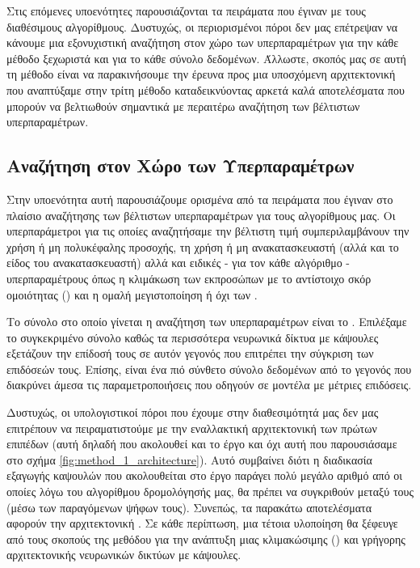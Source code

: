 Στις επόμενες υπο\textendash ενότητες παρουσιάζονται τα πειράματα που έγιναν με τους διαθέσιμους αλγορίθμους. Δυστυχώς, οι περιορισμένοι πόροι δεν μας επέτρεψαν να κάνουμε μια εξονυχιστική αναζήτηση στον χώρο των υπερπαραμέτρων για την κάθε μέθοδο ξεχωριστά και για το κάθε σύνολο δεδομένων. Άλλωστε, σκοπός μας σε αυτή τη μέθοδο είναι να παρακινήσουμε την έρευνα προς μια υποσχόμενη αρχιτεκτονική που αναπτύξαμε στην τρίτη μέθοδο καταδεικνύοντας αρκετά καλά αποτελέσματα που μπορούν να βελτιωθούν σημαντικά με περαιτέρω αναζήτηση των βέλτιστων υπερπαραμέτρων.\par

\subsection{Αναζήτηση στον Χώρο των Υπερπαραμέτρων}
Στην υποενότητα αυτή παρουσιάζουμε ορισμένα από τα πειράματα που έγιναν στο πλαίσιο αναζήτησης των βέλτιστων υπερπαραμέτρων για τους αλγορίθμους μας. Οι υπερπαράμετροι για τις οποίες αναζητήσαμε την βέλτιστη τιμή συμπεριλαμβάνουν την χρήση ή μη πολυκέφαλης προσοχής, τη χρήση ή μη ανακατασκευαστή (αλλά και το είδος του ανακατασκευαστή) αλλά και ειδικές - για τον κάθε αλγόριθμο - υπερπαραμέτρους όπως η κλιμάκωση των εκπροσώπων με το αντίστοιχο σκόρ ομοιότητας () και η ομαλή μεγιστοποίηση ή όχι των .\par

Το σύνολο στο οποίο γίνεται η αναζήτηση των υπερπαραμέτρων είναι το . Επιλέξαμε το συγκεκριμένο σύνολο καθώς τα περισσότερα νευρωνικά δίκτυα με κάψουλες εξετάζουν την επίδοσή τους σε αυτόν γεγονός που επιτρέπει την σύγκριση των επιδόσεών τους. Επίσης, είναι ένα πιό σύνθετο σύνολο δεδομένων από το  γεγονός που διακρύνει άμεσα τις παραμετροποιήσεις που οδηγούν σε μοντέλα με μέτριες επιδόσεις.\par

Δυστυχώς, οι υπολογιστικοί πόροι που έχουμε στην διαθεσιμότητά μας δεν μας επιτρέπουν να πειραματιστούμε με την εναλλακτική αρχιτεκτονική των πρώτων επιπέδων (αυτή δηλαδή που ακολουθεί και το έργο \cite{hinton2018matrix} και όχι αυτή που παρουσιάσαμε στο σχήμα \ref{fig:method_1_architecture}). Αυτό συμβαίνει διότι η διαδικασία εξαγωγής καψουλών που ακολουθείται στο έργο \cite{sabour2017dynamic} παράγει πολύ μεγάλο αριθμό από  οι οποίες λόγω του αλγορίθμου δρομολόγησής μας, θα πρέπει να συγκριθούν μεταξύ τους (μέσω των παραγόμενων ψήφων τους). Συνεπώς, τα παρακάτω αποτελέσματα αφορούν την αρχιτεκτονική . Σε κάθε περίπτωση, μια τέτοια υλοποίηση θα ξέφευγε από τους σκοπούς της μεθόδου για την ανάπτυξη μιας κλιμακώσιμης () και γρήγορης αρχιτεκτονικής νευρωνικών δικτύων με κάψουλες.\par

